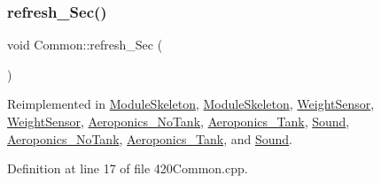 \mbox{\label{class_common_acd1fdd47fbf8bb490f5c6d3ab6cd8d05}} 
\subsubsection{\texorpdfstring{refresh\+\_\+\+Sec()}{refresh\_Sec()}\hspace{0.1cm}{\footnotesize\ttfamily [2/2]}}
{\footnotesize\ttfamily void Common\+::refresh\+\_\+\+Sec (\begin{DoxyParamCaption}{ }\end{DoxyParamCaption})\hspace{0.3cm}{\ttfamily [virtual]}}



Reimplemented in \hyperlink{class_module_skeleton_ae9b2578a2c1ecb343cd7b3b21320145e}{Module\+Skeleton}, \hyperlink{class_module_skeleton_ae9b2578a2c1ecb343cd7b3b21320145e}{Module\+Skeleton}, \hyperlink{class_weight_sensor_a6f7c6cab318b6677e43b7deb9e0b5fee}{Weight\+Sensor}, \hyperlink{class_weight_sensor_a6f7c6cab318b6677e43b7deb9e0b5fee}{Weight\+Sensor}, \hyperlink{class_aeroponics___no_tank_a8e0130107832f0a60d37ea581f6f67fb}{Aeroponics\+\_\+\+No\+Tank}, \hyperlink{class_aeroponics___tank_a9b1c9377aec2a453e4562bca5ae7afa2}{Aeroponics\+\_\+\+Tank}, \hyperlink{class_sound_a747a131af54af0747775b918aa3f7925}{Sound}, \hyperlink{class_aeroponics___no_tank_a8e0130107832f0a60d37ea581f6f67fb}{Aeroponics\+\_\+\+No\+Tank}, \hyperlink{class_aeroponics___tank_a9b1c9377aec2a453e4562bca5ae7afa2}{Aeroponics\+\_\+\+Tank}, and \hyperlink{class_sound_a747a131af54af0747775b918aa3f7925}{Sound}.



Definition at line 17 of file 420\+Common.\+cpp.

